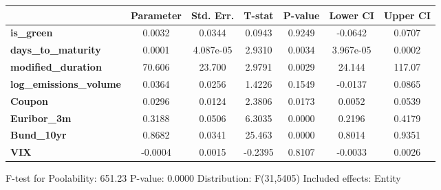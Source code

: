 \begin{center}
\begin{tabular}{lclc}
\bottomrule
\end{tabular}
\begin{tabular}{lcccccc}
                                & \textbf{Parameter} & \textbf{Std. Err.} & \textbf{T-stat} & \textbf{P-value} & \textbf{Lower CI} & \textbf{Upper CI}  \\
\midrule
\textbf{is\_green}              &       0.0032       &       0.0344       &      0.0943     &      0.9249      &      -0.0642      &       0.0707       \\
\textbf{days\_to\_maturity}     &       0.0001       &     4.087e-05      &      2.9310     &      0.0034      &     3.967e-05     &       0.0002       \\
\textbf{modified\_duration}     &       70.606       &       23.700       &      2.9791     &      0.0029      &       24.144      &       117.07       \\
\textbf{log\_emissions\_volume} &       0.0364       &       0.0256       &      1.4226     &      0.1549      &      -0.0137      &       0.0865       \\
\textbf{Coupon}                 &       0.0296       &       0.0124       &      2.3806     &      0.0173      &       0.0052      &       0.0539       \\
\textbf{Euribor\_3m}            &       0.3188       &       0.0506       &      6.3035     &      0.0000      &       0.2196      &       0.4179       \\
\textbf{Bund\_10yr}             &       0.8682       &       0.0341       &      25.463     &      0.0000      &       0.8014      &       0.9351       \\
\textbf{VIX}                    &      -0.0004       &       0.0015       &     -0.2395     &      0.8107      &      -0.0033      &       0.0026       \\
\bottomrule
\end{tabular}
\end{center}

F-test for Poolability: 651.23 \newline
 P-value: 0.0000 \newline
 Distribution: F(31,5405) \newline
  \newline
 Included effects: Entity
